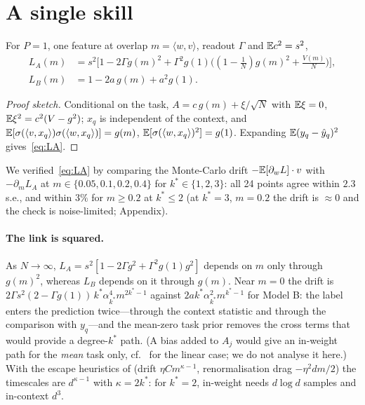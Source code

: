 \section{A single skill}
\label{sec:single}

\begin{proposition}
\label{prop:loss}
For $P=1$, one feature at overlap $m=\langle w,v\rangle$, readout $\Gamma$ and $\mathbb{E} c^2=s^2$,
\begin{equation}
\begin{aligned}
L_A(m)&=s^2\Big[1-2\Gamma g(m)^2+\Gamma^2 g(1)\Big((1-\tfrac1N)g(m)^2+\tfrac{V(m)}{N}\Big)\Big],\\
L_B(m)&=1-2a\,g(m)+a^2g(1).
\end{aligned}
\label{eq:LA}
\end{equation}
\end{proposition}
\begin{proof}[Proof sketch]
Conditional on the task, $A=c\,g(m)+\xi/\sqrt N$ with $\mathbb{E}\xi=0$, $\mathbb{E}\xi^2=c^2(V-g^2)$; $x_q$ is independent of the context, and
$\mathbb{E}[\sigma(\langle v,x_q\rangle)\sigma(\langle w,x_q\rangle)]=g(m)$, $\mathbb{E}[\sigma(\langle w,x_q\rangle)^2]=g(1)$. Expanding $\mathbb{E}(y_q-\hat y_q)^2$ gives~\eqref{eq:LA}.
\end{proof}
We verified~\eqref{eq:LA} by comparing the Monte-Carlo drift $-\mathbb{E}[\partial_wL]\cdot v$ with $-\partial_mL_A$ at $m\in\{0.05,0.1,0.2,0.4\}$ for
$k^*\in\{1,2,3\}$: all 24 points agree within $2.3$ s.e., and within $3\%$ for $m\ge0.2$ at $k^*\le2$ (at $k^*=3$, $m=0.2$ the drift is $\approx0$ and the check is noise-limited; Appendix).

\paragraph{The link is squared.} As $N\to\infty$, $L_A=s^2[1-2\Gamma g^2+\Gamma^2g(1)g^2]$ depends on $m$ only through $g(m)^2$, whereas
$L_B$ depends on it through $g(m)$. Near $m=0$ the drift is $2\Gamma s^2(2-\Gamma g(1))\,k^*\alpha_{k^*}^4m^{2k^*-1}$ against
$2ak^*\alpha_{k^*}^2m^{k^*-1}$ for Model B: the label enters the prediction twice---through the context statistic and through the
comparison with $y_q$---and the mean-zero task prior removes the cross terms that would provide a degree-$k^*$ path. (A bias added to $A_j$ would give an in-weight path for the \emph{mean} task only, cf.\ \citet{zhang2024incontext} for the linear case;
we do not analyse it here.)
With the escape heuristics of \citet{benarous2021online} (drift $\eta Cm^{\kappa-1}$, renormalisation drag $-\eta^2dm/2$) the
timescales are $d^{\kappa-1}$ with $\kappa=2k^*$: for $k^*=2$, in-weight needs $d\log d$ samples and in-context $d^3$.

